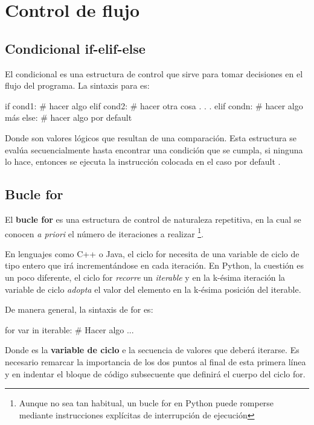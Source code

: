 \section{Control de flujo}

\subsection{Condicional if-elif-else}

El condicional  es una estructura de control que sirve para tomar decisiones 
en el flujo del programa. La sintaxis para  es:

\begin{python}
if cond1:
    # hacer algo 
elif cond2:
    # hacer otra cosa
    .
    .
    .
elif condn:
    # hacer algo más
else:
    # hacer algo por default
\end{python}

Donde  son valores lógicos que resultan de una comparación. Esta estructura se evalúa 
secuencialmente hasta encontrar una condición que se cumpla, si ninguna lo hace, entonces se ejecuta la instrucción 
colocada en el caso por default .



\subsection{Bucle for}

El \textbf{bucle for} es una estructura de control de naturaleza repetitiva, en la cual se conocen 
\textit{a priori} el número de iteraciones a realizar \footnote{Aunque no sea tan habitual, un bucle for en Python puede 
romperse mediante instrucciones explícitas de interrupción de ejecución}. 

En lenguajes como C++ o Java, el ciclo for necesita de una variable de ciclo de tipo entero 
que irá incrementándose en cada iteración. En Python, la cuestión es un poco diferente, el ciclo 
for \textit{recorre} un \textit{iterable} y en la k-ésima iteración la variable de ciclo \textit{adopta} el 
valor del elemento en la k-ésima posición del iterable.

De manera general, la sintaxis de for es:

\begin{python}
for var in iterable:
    # Hacer algo ...
\end{python}

Donde  es la \textbf{variable de ciclo} e  la secuencia de valores que deberá iterarse. 
Es necesario remarcar la importancia de los dos puntos al final de esta primera línea y en indentar el bloque de 
código subsecuente que definirá el cuerpo del ciclo for.

